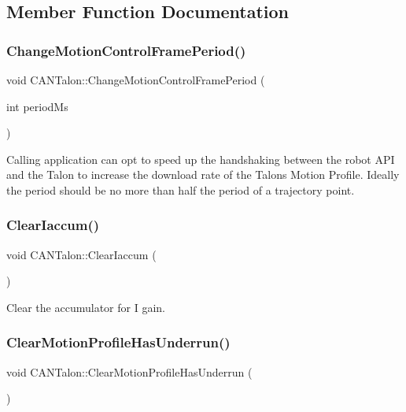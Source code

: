 \subsection{Member Function Documentation}
\mbox{\label{class_c_a_n_talon_a2800e203e1e13587acb2b94df2fc4260}} 
\subsubsection{\texorpdfstring{Change\+Motion\+Control\+Frame\+Period()}{ChangeMotionControlFramePeriod()}}
{\footnotesize\ttfamily void C\+A\+N\+Talon\+::\+Change\+Motion\+Control\+Frame\+Period (\begin{DoxyParamCaption}\item[{int}]{period\+Ms }\end{DoxyParamCaption})}

Calling application can opt to speed up the handshaking between the robot A\+PI and the Talon to increase the download rate of the Talon\textquotesingle{}s Motion Profile. Ideally the period should be no more than half the period of a trajectory point. \mbox{\label{class_c_a_n_talon_aee51ab1fb48c625361d77e73d3c158a0}} 
\subsubsection{\texorpdfstring{Clear\+Iaccum()}{ClearIaccum()}}
{\footnotesize\ttfamily void C\+A\+N\+Talon\+::\+Clear\+Iaccum (\begin{DoxyParamCaption}{ }\end{DoxyParamCaption})}

Clear the accumulator for I gain. \mbox{\label{class_c_a_n_talon_a0a5798f899e2e112500eabdeccfde8fa}} 
\subsubsection{\texorpdfstring{Clear\+Motion\+Profile\+Has\+Underrun()}{ClearMotionProfileHasUnderrun()}}
{\footnotesize\ttfamily void C\+A\+N\+Talon\+::\+Clear\+Motion\+Profile\+Has\+Underrun (\begin{DoxyParamCaption}{ }\end{DoxyParamCaption})}

